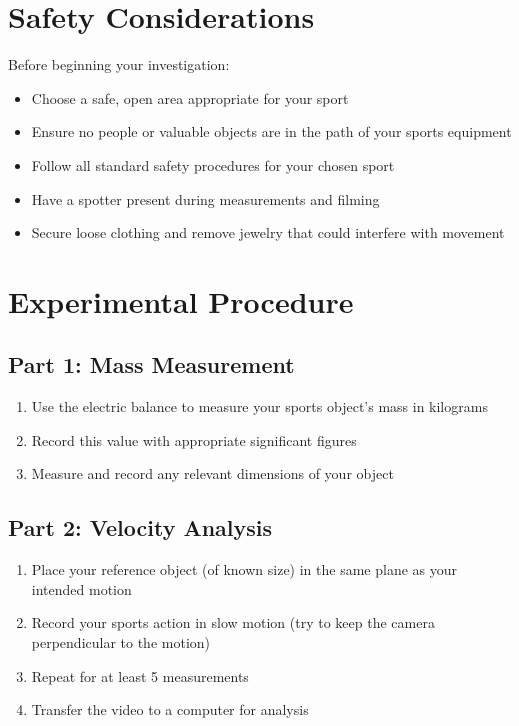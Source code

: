\documentclass[12pt]{article}
\begin{document}
\section*{Safety Considerations}
\begin{tcolorbox}[colback=safetyyellow!30,colframe=safetyyellow!80,title=\textbf{Safety Protocol}]
Before beginning your investigation:
\begin{itemize}
\item Choose a safe, open area appropriate for your sport
\item Ensure no people or valuable objects are in the path of your sports equipment
\item Follow all standard safety procedures for your chosen sport
\item Have a spotter present during measurements and filming
\item Secure loose clothing and remove jewelry that could interfere with movement
\end{itemize}
\end{tcolorbox}

\section*{Experimental Procedure}

\subsection*{Part 1: Mass Measurement}
\begin{enumerate}[label=\arabic*.]
\item Use the electric balance to measure your sports object's mass in kilograms
\item Record this value with appropriate significant figures
\item Measure and record any relevant dimensions of your object
\end{enumerate}

\subsection*{Part 2: Velocity Analysis}
\begin{enumerate}[label=\arabic*.]
\item Place your reference object (of known size) in the same plane as your intended motion
\item Record your sports action in slow motion (try to keep the camera perpendicular to the motion)
\item Repeat for at least 5 measurements
\item Transfer the video to a computer for analysis

\end{enumerate}
\end{document}
